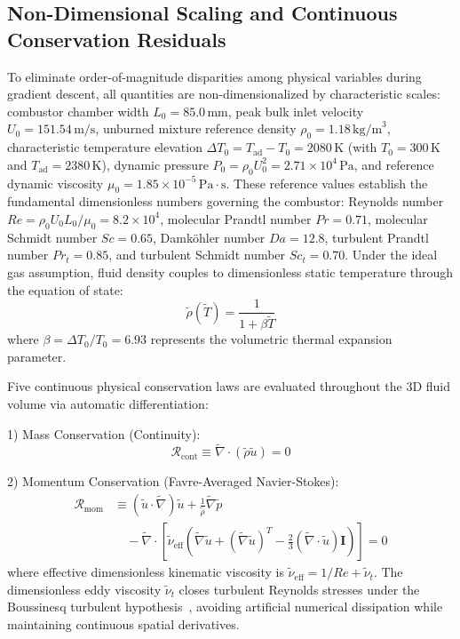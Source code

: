\documentclass[reprint,aps,prfluids,superscriptaddress,twocolumn,floatfix]{revtex4-2}
\begin{document}
\subsection{Non-Dimensional Scaling and Continuous Conservation Residuals}
\label{subsec:nondimensional_residuals}

To eliminate order-of-magnitude disparities among physical variables during gradient descent, all quantities are non-dimensionalized by characteristic scales: combustor chamber width $L_0 = 85.0\,\text{mm}$, peak bulk inlet velocity $U_0 = 151.54\,\text{m/s}$, unburned mixture reference density $\rho_0 = 1.18\,\text{kg/m}^3$, characteristic temperature elevation $\Delta T_0 = T_{\text{ad}} - T_0 = 2080\,\text{K}$ (with $T_0 = 300\,\text{K}$ and $T_{\text{ad}} = 2380\,\text{K}$), dynamic pressure $P_0 = \rho_0 U_0^2 = 2.71 \times 10^4\,\text{Pa}$, and reference dynamic viscosity $\mu_0 = 1.85 \times 10^{-5}\,\text{Pa}\cdot\text{s}$. These reference values establish the fundamental dimensionless numbers governing the combustor: Reynolds number $Re = \rho_0 U_0 L_0 / \mu_0 = 8.2 \times 10^4$, molecular Prandtl number $Pr = 0.71$, molecular Schmidt number $Sc = 0.65$, Damk{\"o}hler number $Da = 12.8$, turbulent Prandtl number $Pr_t = 0.85$, and turbulent Schmidt number $Sc_t = 0.70$. Under the ideal gas assumption, fluid density couples to dimensionless static temperature through the equation of state:
\begin{equation}
    \tilde{\rho}(\tilde{T}) = \frac{1}{1 + \beta \tilde{T}}
    \label{eq:state_density}
\end{equation}
where $\beta = \Delta T_0 / T_0 = 6.93$ represents the volumetric thermal expansion parameter.

Five continuous physical conservation laws are evaluated throughout the 3D fluid volume via automatic differentiation:

1) Mass Conservation (Continuity):
\begin{equation}
    \mathcal{R}_{\text{cont}} \equiv \tilde{\nabla} \cdot (\tilde{\rho} \tilde{u}) = 0
    \label{eq:residual_continuity}
\end{equation}

2) Momentum Conservation (Favre-Averaged Navier-Stokes):
\begin{align}
    \mathcal{R}_{\text{mom}} &\equiv (\tilde{u} \cdot \tilde{\nabla})\tilde{u} + \frac{1}{\tilde{\rho}}\tilde{\nabla}\tilde{p} \nonumber \\
    &\quad - \tilde{\nabla} \cdot \left[ \tilde{\nu}_{\text{eff}} \left( \tilde{\nabla}\tilde{u} + (\tilde{\nabla}\tilde{u})^T - \frac{2}{3}(\tilde{\nabla}\cdot\tilde{u})\mathbf{I} \right) \right] = 0
    \label{eq:residual_momentum}
\end{align}
where effective dimensionless kinematic viscosity is $\tilde{\nu}_{\text{eff}} = 1/Re + \tilde{\nu}_t$. The dimensionless eddy viscosity $\tilde{\nu}_t$ closes turbulent Reynolds stresses under the Boussinesq turbulent hypothesis~\cite{raissi2019deep}, avoiding artificial numerical dissipation while maintaining continuous spatial derivatives.
\end{document}
